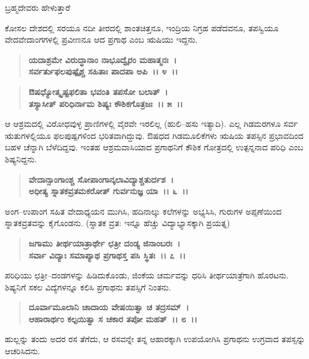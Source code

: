 \begin{flushleft}
ಬ್ರಹ್ಮದೇವರು ಹೇಳುತ್ತಾರೆ
\end{flushleft}

ಕೋಸಲ ದೇಶದಲ್ಲಿ ಸರಯೂ ನದೀ ತೀರದಲ್ಲಿ ಶಾಂತಚಿತ್ತನೂ, ಇಂದ್ರಿಯ ನಿಗ್ರಹ ಪಡೆದವನೂ, ತಪಸ್ವಿಯೂ ವೇದವೇದಾಂಗಗಳಲ್ಲಿ ಪ್ರವೀಣನೂ ಆದ ಪ್ರಗಾಥ ಎಂಬ ಋಷಿಯು ಇದ್ದನು.

\begin{verse}
\textbf{ಯದಾಶ್ರಮೇ ವಿರುದ್ಧಾನಾಂ ನಾಭೂದ್ವೈರಂ ಮಹಾತ್ಮನಃ~।}\\\textbf{ಸರ್ವರ್ತುಫಲಪುಷ್ಪೈಶ್ಚ ಸಹಿತಾಃ ಪಾದಪಾ ಅಪಿ~।। ೪~।। }
\end{verse}

\begin{verse}
\textbf{ಔಷಧ್ಯೋತ್ಕೃಷ್ಟಫಲಿತಾ ಭವಂತಿ ತಪಸೋ ಬಲಾತ್~।}\\\textbf{ತಸ್ಯಾಸೀತ್ ಪರಿಧಿರ್ನಾಮ ಶಿಷ್ಯಃ ಕೌಶಿಕಗೊತ್ರಜಃ~।। ೫~।।}
\end{verse}

ಆ ಆಶ್ರಮದಲ್ಲಿ ವಿರೋಧವುಳ್ಳ ಪ್ರಾಣಿಗಳಲ್ಲಿ ವೈರವೇ ಇರಲಿಲ್ಲ (ಹುಲಿ–ಹಸು ಇತ್ಯಾದಿ). ಎಲ್ಲ ಗಿಡಮರಗಳೂ ಸರ್ವ ಋತುಗಳಲ್ಲಿಯೂ ಫಲಪುಷ್ಪಗಳಿಂದ ಭರಿತವಾಗಿದ್ದುವು. ಔಷಧದ ಗಿಡಮೂಲಿಕೆಗಳು ಋಷಿಯ ತಪಸ್ಸಿನ ಪ್ರಭಾವದಿಂದ ಬಹಳ ಚೆನ್ನಾಗಿ ಬೆಳೆದಿದ್ದವು. ಇಂತಹ ಆಶ್ರಮವಾಸಿಯಾದ ಪ್ರಗಾಥನಿಗೆ ಕೌಶಿಕ ಗೋತ್ರದಲ್ಲಿ ಉತ್ಪನ್ನನಾದ ಪರಿಧಿ ಎಂಬ ಶಿಷ್ಯನಿದ್ದನು.

\begin{verse}
\textbf{ವೇದಾನ್ಸಾಂಗಾಂಶ್ಚ ಸೋಪಾಂಗಾನ್ಕಲಾವಿದ್ಯಾಶ್ಚತುರ್ದಶ~।}\\\textbf{ಅಧೀತ್ಯ ಸ್ನಾತಕವ್ರತಮಕರೋತ್ ಗುರ್ವನುಜ್ಞ ಯಾ~।। ೬~।।}
\end{verse}

ಅಂಗ–ಉಪಾಂಗ ಸಹಿತ ವೇದಾಧ್ಯಯನ ಮುಗಿಸಿ, ಹದಿನಾಲ್ಕು ಕಲೆಗಳನ್ನು ಅಭ್ಯಸಿಸಿ, ಗುರುಗಳ ಅಪ್ಪಣೆಯಿಂದ ಸ್ನಾತಕವ್ರತವನ್ನು ಕೈಗೊಂಡನು. (ಸ್ನಾತಕ ವ್ರತ: ಇನ್ನೂ ಹೆಚ್ಚು ವಿದ್ಯಾಭ್ಯಾಸಕ್ಕಾಗಿ ಪ್ರಯತ್ನ)

\begin{verse}
\textbf{ಜಗಾಮು ತೀರ್ಥಯಾತ್ರಾರ್ಥೇ ಛತ್ರೀ ದಂಡ್ಯ ಜಿನಾಂಬರಃ~।}\\\textbf{ಸರ್ವಾ ವಿದ್ಯಾಃ ಸಮಾಪ್ಯಾಥ ಪ್ರಗಾಥಸ್ತ ಪಸಿ ಸ್ಥಿತಃ~।। ೭~।।}
\end{verse}

ಪರಿಧಿಯು ಛತ್ರೀ–ದಂಡಗಳನ್ನು ಹಿಡಿದುಕೊಂಡು, ಜಿಂಕೆಯ ಚರ್ಮವನ್ನು ಧರಿಸಿ ತೀರ್ಥಯಾತ್ರೆಗಾಗಿ ಹೊರಟನು. ಶಿಷ್ಯನಿಗೆ ಸಕಲ ವಿದ್ಯೆಗಳನ್ನೂ ಕಲಿಸಿ ಪ್ರಗಾಥನು ತಪಸ್ಸಿಗೆ ನಿಂತನು.

\begin{verse}
\textbf{ದೂರ್ವಾಮೂಲಾನಿ ಚಾದಾಯ ವೇಷಯಿತ್ವಾ ಚ ತದ್ರಸಮ್~।}\\\textbf{ಆಹಾರಾರ್ಥಂ ಕಲ್ಪಯಿತ್ವಾ ಸ ಚಕಾರ ತಪೋ ಮಹತ್~।। ೮~।।}
\end{verse}

ಹುಲ್ಲನ್ನು ತಂದು ಅದರ ರಸ ತೆಗೆದು, ಆ ರಸವನ್ನೇ ತನ್ನ ಆಹಾರಕ್ಕಾಗಿ ಉಪಯೋಗಿಸಿ ಪ್ರಗಾಥನು ಉಗ್ರವಾದ ತಪಸ್ಸನ್ನು ಆಚರಿಸಿದನು.

